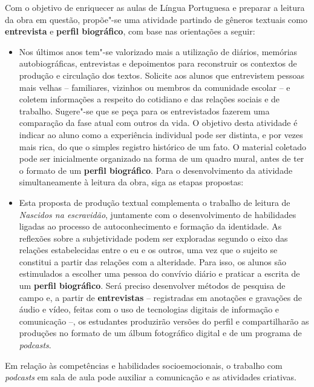 \documentclass[11pt]{extarticle}
\begin{document}
Com o objetivo de enriquecer as aulas de Língua Portuguesa e preparar a
leitura da obra em questão, propõe"-se uma atividade partindo de gêneros
textuais como \textbf{entrevista} e \textbf{perfil biográfico}, com base
nas orientações a seguir:

\begin{itemize}
\item
  Nos últimos anos tem"-se valorizado mais a utilização de diários,
  memórias autobiográficas, entrevistas e depoimentos para reconstruir
  os contextos de produção e circulação dos textos. Solicite aos alunos
  que entrevistem pessoas mais velhas -- familiares, vizinhos ou membros
  da comunidade escolar -- e coletem informações a respeito do cotidiano
  e das relações sociais e de trabalho. Sugere"-se que se peça para os
  entrevistados fazerem uma comparação da fase atual com outros da vida.
  O objetivo desta atividade é indicar ao aluno como a experiência
  individual pode ser distinta, e por vezes mais rica, do que o simples
  registro histórico de um fato. O material coletado pode ser
  inicialmente organizado na forma de um quadro mural, antes de ter o
  formato de um \textbf{perfil biográfico}. Para o desenvolvimento da
  atividade simultaneamente à leitura da obra, siga as etapas propostas:

\item
  Esta proposta de produção textual complementa o trabalho de leitura de
  \emph{Nascidos na escravidão}, juntamente com o desenvolvimento de
  habilidades ligadas ao processo de autoconhecimento e formação da
  identidade. As reflexões sobre a subjetividade podem ser exploradas
  segundo o eixo das relações estabelecidas entre o eu e os outros, uma
  vez que o sujeito se constitui a partir das relações com a alteridade.
  Para isso, os alunos são estimulados a escolher uma pessoa do convívio
  diário e praticar a escrita de um \textbf{perfil biográfico}. Será
  preciso desenvolver métodos de pesquisa de campo e, a partir de
  \textbf{entrevistas} -- registradas em anotações e gravações de áudio
  e vídeo, feitas com o uso de tecnologias digitais de informação e
  comunicação --, os estudantes produzirão versões do perfil e
  compartilharão as produções no formato de um álbum fotográfico digital
  e de um programa de \emph{podcasts}.
\end{itemize}

Em relação às competências e habilidades socioemocionais, o trabalho com
\emph{podcasts} em sala de aula pode auxiliar a comunicação e as
atividades criativas.
\end{document}
